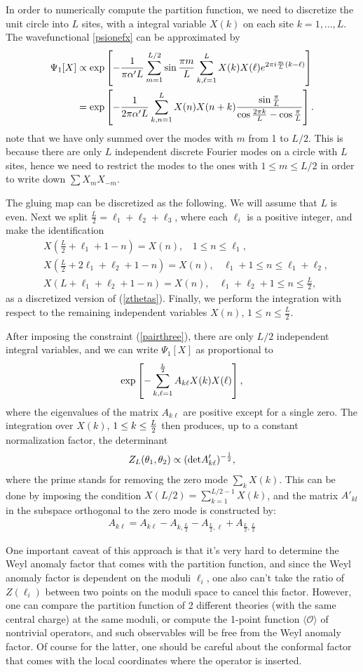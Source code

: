 \documentclass[12pt,letterpaper]{article}
\def\ie{\begin{equation}\begin{aligned}}
\def\fe{\end{aligned}\end{equation}}
\numberwithin{equation}{section}
\newcommand{\A}{{\alpha}}
\begin{document}
In order to numerically compute the partition function, we need to discretize the unit circle into $L$ sites, with a integral variable $X(k)$ on each site $k=1,...,L$. The wavefunctional \eqref{psionefx} can be approximated by
\ie
\Psi_1[X] &\propto \exp\left[ - {1\over \pi \A' L} \sum_{m=1}^{L/2} \sin {\pi m \over L} \sum_{k,\ell=1}^L X(k) X(\ell) e^{2\pi i {m\over L} (k-\ell)} \right]
\\
&= \exp\left[ - {1\over 2 \pi \A' L} \sum_{k,n=1}^L X(n) X(n+k) { \sin {\pi\over L} \over \cos{2\pi k\over L} - \cos{\pi\over L}} \right] .
\fe
note that we have only summed over the modes with $m$ from 1 to $L/2$. This is because there are only $L$ independent discrete Fourier modes on a circle with $L$ sites, hence we need to restrict the modes to the ones with $1\leq m\leq L/2$ in order to write down $\sum X_m X_{-m}$.

The gluing map can be discretized as the following. We will assume that $L$ is even. Next we split $\tfrac{L}{ 2} =\ell_1 + \ell_2 + \ell_3$, where each $\ell_i$ is a positive integer, and make the identification
\ie\label{pairthree}
& X(\tfrac{L}{2} + \ell_1+1 - n) = X(n),~~~~ 1\leq n \leq \ell_1,
\\
& X(\tfrac{L}{2} + 2 \ell_1 + \ell_2 +1 - n) = X(n),~~~~ \ell_1+1 \leq n \leq \ell_1 + \ell_2,
\\
& X(L+\ell_1 + \ell_2+1 - n) = X(n),~~~~ \ell_1+\ell_2+1 \leq n \leq \tfrac{L}{2},
\fe
as a discretized version of (\ref{zthetas}). Finally, we perform the integration with respect to the remaining independent variables $X(n)$, $1\leq n \leq \tfrac{L}{2}$.

After imposing the constraint (\ref{pairthree}), there are only $L/2$ independent integral variables, and we can write $\Psi_1[X]$ as proportional to
\ie
\exp\left[ - \sum_{k,\ell=1}^{L\over 2} A_{k\ell} X(k) X(\ell) \right],
\fe
where the eigenvalues of the matrix $A_{k\ell}$ are positive except for a single zero. The integration over $X(k)$, $1\leq k\leq {L\over 2}$ then produces, up to a constant normalization factor, the determinant
\ie\label{detprime}
Z_L(\theta_1, \theta_2) \propto ({\det} A_{k\ell}')^{-{1\over 2}},
\fe
where the prime stands for removing the zero mode $\sum_k X(k)$. This can be done by imposing the condition $X({L/2})=\sum_{k=1}^{L/2-1}X(k)$, and the matrix $A'_{kl}$ in the subspace orthogonal to the zero mode is constructed by:
\ie
A_{k\ell}= A_{k\ell}-A_{k,\frac{L}{2}}-A_{\frac{L}{2},\ell}+A_{\frac{L}{2}, \frac{L}{2}}
\fe

One important caveat of this approach is that it's very hard to determine the Weyl anomaly factor that comes with the partition function, and since the Weyl anomaly factor is dependent on the moduli $\ell_i$, one also can't take the ratio of $Z(\ell_i)$ between two points on the moduli space to cancel this factor. However, one can compare the partition function of 2 different theories (with the same central charge) at the same moduli, or compute the 1-point function $\langle \mathcal{O}\rangle$ of nontrivial operators, and such observables will be free from the Weyl anomaly factor. Of course for the latter, one should be careful about the conformal factor that comes with the local coordinates where the operator is inserted.
\end{document}
